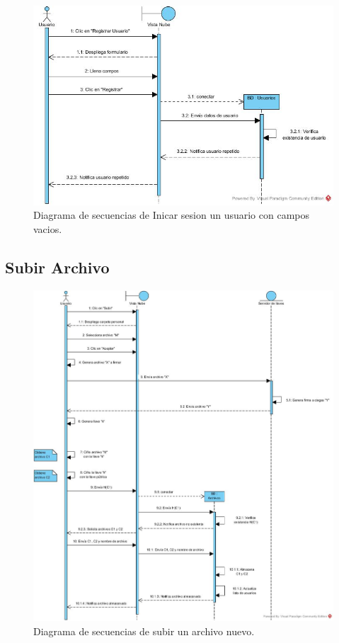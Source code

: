 \begin{figure}[htbp!]
		\centering
			\includegraphics[width=1\textwidth]{images/Registrar_trayectoria_c}
		\caption{Diagrama de secuencias de  Inicar sesion un usuario con campos vacios.}
\end{figure} 
\newpage

\subsection{Subir Archivo}

\begin{figure}[htbp!]
		\centering
			\includegraphics[width=1\textwidth]{images/Subir_Archivo}
		\caption{Diagrama de secuencias de subir un archivo nuevo.}
\end{figure}

